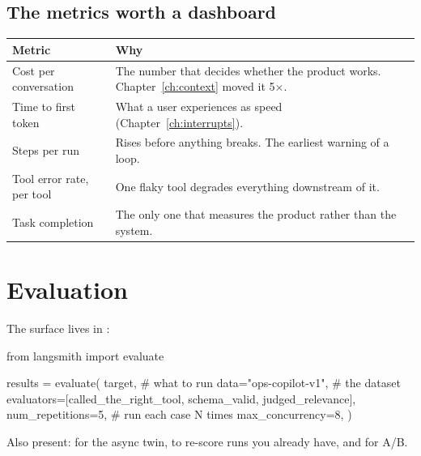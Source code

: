 \subsection{The metrics worth a dashboard}
\label{sec:metrics}

\begin{center}
\small
\begin{tabularx}{\linewidth}{@{}lX@{}}
\toprule
\textbf{Metric} & \textbf{Why} \\
\midrule
Cost per conversation & The number that decides whether the product works.
  Chapter~\ref{ch:context} moved it 5$\times$. \\[3pt]
Time to first token & What a user experiences as speed
  (Chapter~\ref{ch:interrupts}). \\[3pt]
Steps per run & Rises before anything breaks. The earliest warning of a
  loop. \\[3pt]
Tool error rate, per tool & One flaky tool degrades everything downstream of
  it. \\[3pt]
Task completion & The only one that measures the product rather than the
  system. \\
\bottomrule
\end{tabularx}
\end{center}

\section{Evaluation}
\label{sec:evaluation}

The surface lives in :

\begin{python}[caption={An evaluation run}, label={lst:evaluate}]
from langsmith import evaluate

results = evaluate(
    target,                      # what to run
    data="ops-copilot-v1",       # the dataset
    evaluators=[called_the_right_tool, schema_valid, judged_relevance],
    num_repetitions=5,           # run each case N times
    max_concurrency=8,
)
\end{python}

Also present:  for the async twin,  to
re-score runs you already have, and  for A/B.

